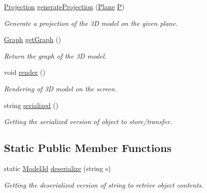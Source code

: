 \begin{DoxyCompactItemize}
\mbox{\hyperlink{class_projection}{Projection}} \mbox{\hyperlink{class_model3d_a3291f4f760e39b1bf5b6e62a3ea3ed83}{generate\+Projection}} (\mbox{\hyperlink{class_plane}{Plane}} \mbox{\hyperlink{class_model3d_ab7f731b1e8f73853a6c20128789df465}{P}})
\begin{DoxyCompactList}\small\item\em Generate a projection of the 3D model on the given plane. \end{DoxyCompactList}\item 
\mbox{\hyperlink{class_graph}{Graph}} \mbox{\hyperlink{class_model3d_af1a05008f590aa70b58a9d4ff02574a8}{get\+Graph}} ()
\begin{DoxyCompactList}\small\item\em Return the graph of the 3D model. \end{DoxyCompactList}\item 
void \mbox{\hyperlink{class_model3d_a22625c8d30e89f11d8b11530db2e811f}{render}} ()
\begin{DoxyCompactList}\small\item\em Rendering of 3D model on the screen. \end{DoxyCompactList}\item 
string \mbox{\hyperlink{class_model3d_a442e583f7f65ba5b4883cd29325c9710}{serialized}} ()
\begin{DoxyCompactList}\small\item\em Getting the serialized version of object to store/transfer. \end{DoxyCompactList}\end{DoxyCompactItemize}
\subsection*{Static Public Member Functions}
\begin{DoxyCompactItemize}
\item 
static \mbox{\hyperlink{class_model3d}{Model3d}} \mbox{\hyperlink{class_model3d_af45a652605d93085f253b044bfd34e1a}{deserialize}} (string s)
\begin{DoxyCompactList}\small\item\em Getting the deserialized version of string to retrive object contents. \end{DoxyCompactList}\end{DoxyCompactItemize}
